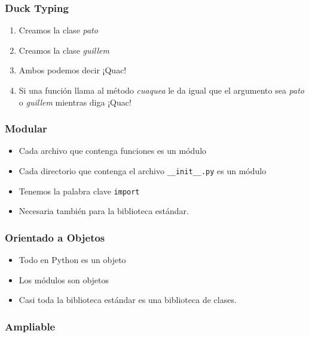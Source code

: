 \documentclass[12pt,mathserif,compress]{beamer}
\begin{document}
\begin{frame}
  \frametitle{Duck Typing}
\begin{center}
\end{center}
\begin{enumerate}
\item Creamos la clase \emph{pato}
\item Creamos la clase \emph{guillem}
\pause
\item Ambos podemos decir ¡Quac!
\pause
\item Si una función llama al método \emph{cuaquea} le da igual que el
  argumento sea \emph{pato} o \emph{guillem} mientras diga ¡Quac!
\end{enumerate}
\end{frame}

\begin{frame}
  \frametitle{Modular}
  \begin{itemize}
  \item Cada archivo que contenga funciones es un módulo
  \item Cada directorio que contenga el archivo \texttt{__init__.py}
    es un módulo
  \item Tenemos la palabra clave \texttt{import}
  \item Necesaria también para la biblioteca estándar.
  \end{itemize}
\end{frame}

\begin{frame}
  \frametitle{Orientado a Objetos}
  \begin{itemize}
  \item Todo en Python es un objeto
  \item Los módulos son objetos
  \item Casi toda la biblioteca estándar es una biblioteca de clases.
  \end{itemize}
\testcode
\end{frame}

\begin{frame}
  \frametitle{Ampliable}
\end{frame}
\end{document}
